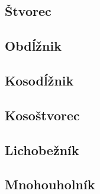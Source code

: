 \documentclass[12pt, twopage]{article}
\theoremstyle{definition}
\begin{document}
	\subsection{Štvorec}
	
	\subsection{Obdĺžnik}
	
	\subsection{Kosodĺžnik}
	
	\subsection{Kosoštvorec}
	
	\subsection{Lichobežník}
	
	\subsection{Mnohouholník}
\end{document}
